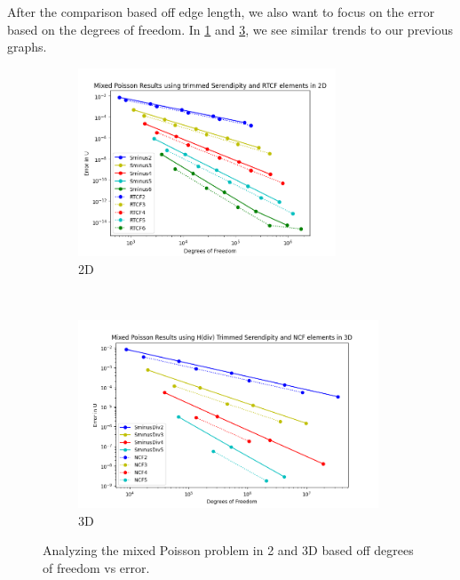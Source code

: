 \documentclass[manuscript,screen]{acmart}
\begin{document}
\noindent After the comparison based off edge length, we also want to focus on the error based on the degrees of freedom.  In \ref{fig:2dMixedDofs} and \ref{fig:3dMixedDofs}, we see similar trends to our previous graphs.

\begin{figure}[h!]
  \centering
  \begin{subfigure}[h]{0.5\textwidth}
    \centering
    \includegraphics[height=2.2in]{MixedPoisson-2d-SminusDiv_RTCF.png}
    \caption{2D}
    \label{fig:2dMixedDofs}
  \end{subfigure}
  ~
  \begin{subfigure}[h]{0.5\textwidth}
    \centering
    \includegraphics[height=2.2in]{MixedPoisson3d_TrimmedSerendipityNCF.png}
    \caption{3D}
    \label{fig:3dMixedDofs}
  \end{subfigure}
  \caption{Analyzing the mixed Poisson problem in 2 and 3D based off degrees of freedom vs error.}
\end{figure} 

\end{document}
